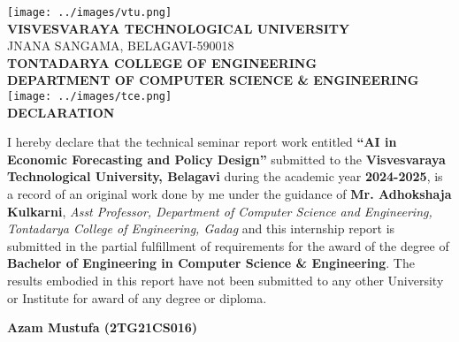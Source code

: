 \begin{titlepage}
    \justifying
    \thispagestyle{empty}
    \centering

    \texttt{[image: ../images/vtu.png]}\\[0.3cm]

    {\LARGE\bfseries{VISVESVARAYA TECHNOLOGICAL UNIVERSITY}}\\[0.2cm]
    {\large{JNANA SANGAMA, BELAGAVI-590018}}\\[0.3cm]

    {\Large\bfseries{TONTADARYA COLLEGE OF ENGINEERING}}\\[0.15cm]
    {\large\bfseries{DEPARTMENT OF COMPUTER SCIENCE \& ENGINEERING}}\\[0.8cm]

    \texttt{[image: ../images/tce.png]}\\[0.8cm] %

    {\Large\bfseries{DECLARATION}}\\[0.8cm]

    \begin{flushleft}
        \setlength{\parindent}{0pt}
        \renewcommand{\baselinestretch}{1.3}\normalsize

        I hereby declare that the technical seminar report work entitled \textbf{{``AI in Economic Forecasting and Policy Design''}}
        submitted to the \textbf{Visvesvaraya Technological University, Belagavi} during the academic year \textbf{2024-2025},
        is a record of an original work done by me under the guidance of \textbf{Mr. Adhokshaja Kulkarni},
        \textit{Asst Professor, Department of Computer Science and Engineering, Tontadarya College of Engineering, Gadag}
        and this internship report is submitted in the partial fulfillment of requirements for the award of the degree of
        \textbf{Bachelor of Engineering in Computer Science \& Engineering}. The results embodied in this report have not
        been submitted to any other University or Institute for award of any degree or diploma.
    \end{flushleft}

    \vfill

    \begin{flushright}
        \textbf{Azam Mustufa (2TG21CS016)}
    \end{flushright}
\end{titlepage}
